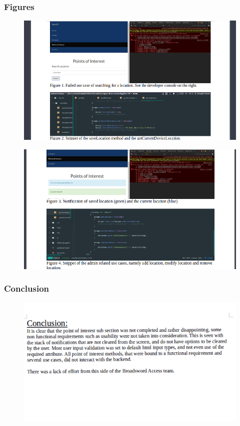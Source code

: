 \documentclass[english]{article}
\begin{document}
\subsubsection{Figures}
\begin{figure}[H]
\hspace*{-2.5cm}
\includegraphics[width=180mm]{fig1-2-poi.png}
\end{figure}
\begin{figure}[H]
\hspace*{-2.5cm}
\includegraphics[width=180mm]{fig3-4-poi.png}
\end{figure}
\subsubsection{Conclusion}
\begin{figure}[H]
\hspace*{-2.5cm}
\includegraphics[width=180mm]{conclusion-poi.png}
\end{figure}
\end{document}
